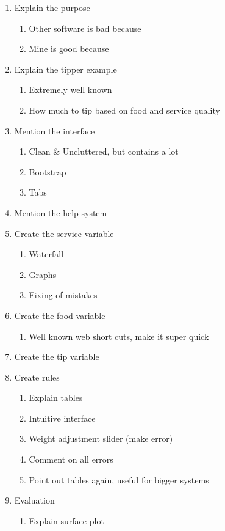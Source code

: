 \documentclass{article}
\begin{document}
\begin{enumerate}
\item Explain the purpose
	\begin{enumerate}
	\item Other software is bad because
	\item Mine is good because
	\end{enumerate}
\item Explain the tipper example
	\begin{enumerate}
	\item Extremely well known
	\item How much to tip based on food and service quality
	\end{enumerate}
\item Mention the interface
	\begin{enumerate}
	\item Clean \& Uncluttered, but contains a lot
	\item Bootstrap
	\item Tabs
	\end{enumerate}
\item Mention the help system
\item Create the service variable
	\begin{enumerate}
	\item Waterfall
	\item Graphs
	\item Fixing of mistakes
	\end{enumerate}
\item Create the food variable
	\begin{enumerate}
	\item Well known web short cuts, make it super quick
	\end{enumerate}
\item Create the tip variable
\item Create rules
	\begin{enumerate}
	\item Explain tables
	\item Intuitive interface
	\item Weight adjustment slider (make error)
	\item Comment on all errors
	\item Point out tables again, useful for bigger systems
	\end{enumerate}
\item Evaluation
	\begin{enumerate}
	\item Explain surface plot

\end{enumerate}
\end{enumerate}
\end{document}
